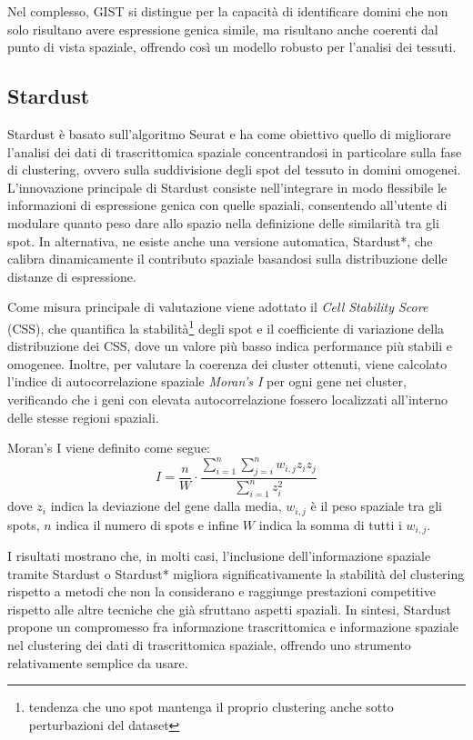 Nel complesso, GIST si distingue per la capacità di 
identificare domini che non solo risultano avere espressione genica simile, 
ma risultano anche coerenti dal punto di vista spaziale, 
offrendo così un modello robusto per l'analisi dei tessuti.
\subsection{Stardust}\label{subsec:Stardust}
Stardust è basato sull'algoritmo Seurat e ha come obiettivo quello di migliorare l'analisi dei dati di trascrittomica spaziale 
concentrandosi in particolare sulla fase di clustering, 
ovvero sulla suddivisione degli spot del tessuto in domini omogenei. 
L'innovazione principale di Stardust consiste nell'integrare in modo flessibile le informazioni di espressione genica con quelle spaziali, 
consentendo all'utente di modulare quanto peso dare allo spazio nella definizione delle similarità tra gli spot. 
In alternativa, ne esiste anche una versione automatica, Stardust*,
che calibra dinamicamente il contributo spaziale basandosi sulla distribuzione delle distanze di espressione.

Come misura principale di valutazione viene adottato il \textit{Cell Stability Score} (CSS), che quantifica la stabilità\footnote{tendenza che uno spot mantenga il proprio clustering anche sotto perturbazioni del dataset} 
degli spot e il coefficiente di variazione della distribuzione dei CSS, dove un valore più basso indica performance più stabili e omogenee.
Inoltre, per valutare la coerenza dei cluster ottenuti, viene calcolato l'indice di autocorrelazione spaziale \textit{Moran's I} per ogni gene nei cluster, 
verificando che i geni con elevata autocorrelazione fossero localizzati all'interno delle stesse regioni spaziali.

Moran's I viene definito come segue:
\begin{equation}
	I = \frac{n}{W} \cdot 
\frac{
    \sum_{i=1}^{n} \sum_{j=i}^{n} w_{i,j} z_i z_j
}{
    \sum_{i=1}^{n} z_i^2
}
\end{equation}
dove $z_i$ indica la deviazione del gene dalla media, $w_{i,j}$ è il peso spaziale tra gli spots, $n$ indica il numero di spots e infine $W$ indica la somma di tutti i $w_{i,j}$.

I risultati mostrano che, in molti casi, l'inclusione dell'informazione spaziale 
tramite Stardust o Stardust* migliora significativamente la stabilità del clustering 
rispetto a metodi che non la considerano e raggiunge prestazioni competitive rispetto 
alle altre tecniche che già sfruttano aspetti spaziali.
In sintesi, Stardust propone un compromesso fra informazione trascrittomica e 
informazione spaziale nel clustering dei dati di trascrittomica spaziale, 
offrendo uno strumento relativamente semplice da usare.

